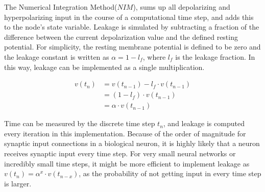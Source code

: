 		The Numerical Integration Method($NIM$), sums up all depolarizing and hyperpolarizing input in the course of a computational time step, and adds this to the node's state variable. 
		Leakage is simulated by subtracting a fraction of the difference between the current depolarization value and the defined resting potential.
		For simplicity, the resting membrane potential is defined to be zero and the leakage constant is written as $\alpha=1-l_f$, where $l_f$ is the leakage fraction.
		In this way, leakage can be implemented as a single multiplication.

\begin{equation}
	\begin{split}
		v(t_n) 	&= v(t_{n-1})-l_f \cdot v(t_{n-1})  	\\
				&= (1-l_f)\cdot v(t_{n-1}) 				\\
				&= \alpha \cdot v(t_{n-1})
	\end{split}
\end{equation}
		
		Time can be measured by the discrete time step $t_n$, and leakage is computed every iteration in this implementation. %
		Because of the order of magnitude for synaptic input connections in a biological neuron, it is highly likely that a neuron receives synaptic input every time step.
		For very small neural networks or incredibly small time steps, it might be more efficient to implement leakage as $v(t_n) = \alpha^x \cdot v(t_{n-x})$,
			as the probability of not getting input in every time step is larger.

